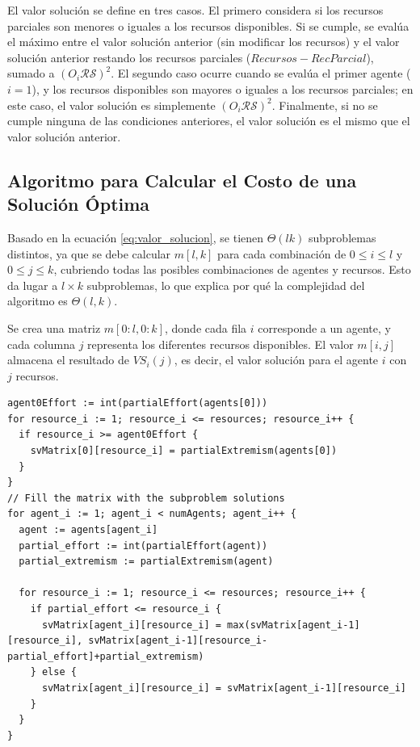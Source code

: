 \documentclass[letterpaper,10pt]{article}
\begin{document}
El valor solución se define en tres casos. El primero considera si los recursos parciales son menores o iguales a los recursos disponibles. Si se cumple, se evalúa el máximo entre el valor solución anterior (sin modificar los recursos) y el valor solución anterior restando los recursos parciales (\(Recursos - RecParcial\)), sumado a \((O_i\mathcal{R}\mathcal{S})^2\). El segundo caso ocurre cuando se evalúa el primer agente (\(i=1\)), y los recursos disponibles son mayores o iguales a los recursos parciales; en este caso, el valor solución es simplemente \((O_i\mathcal{R}\mathcal{S})^2\). Finalmente, si no se cumple ninguna de las condiciones anteriores, el valor solución es el mismo que el valor solución anterior.

\subsection{Algoritmo para Calcular el Costo de una Solución Óptima}
\label{subsec:algoritmo_costo_solucion_optima}
Basado en la ecuación \eqref{eq:valor_solucion}, se tienen \(\Theta(lk)\) subproblemas distintos, ya que se debe calcular \(m[l, k]\) para cada combinación de \(0 \leq i \leq l\) y \(0 \leq j \leq k\), cubriendo todas las posibles combinaciones de agentes y recursos. Esto da lugar a \(l \times k\) subproblemas, lo que explica por qué la complejidad del algoritmo es \(\Theta(l, k)\). 

Se crea una matriz \(m[0:l, 0:k]\), donde cada fila \(i\) corresponde a un agente, y cada columna \(j\) representa los diferentes recursos disponibles. El valor \(m[i,j]\) almacena el resultado de \(VS_i(j)\), es decir, el valor solución para el agente \(i\) con \(j\) recursos.

\begin{lstlisting}[caption={matrix $m$ $\rightarrow$Extracción del algoritmo ModexPD}, label={lst:modexpd_extraccion}]
agent0Effort := int(partialEffort(agents[0]))
for resource_i := 1; resource_i <= resources; resource_i++ {
  if resource_i >= agent0Effort {
    svMatrix[0][resource_i] = partialExtremism(agents[0])
  }
}
// Fill the matrix with the subproblem solutions
for agent_i := 1; agent_i < numAgents; agent_i++ {
  agent := agents[agent_i]
  partial_effort := int(partialEffort(agent))
  partial_extremism := partialExtremism(agent)

  for resource_i := 1; resource_i <= resources; resource_i++ {
    if partial_effort <= resource_i {
      svMatrix[agent_i][resource_i] = max(svMatrix[agent_i-1][resource_i], svMatrix[agent_i-1][resource_i-partial_effort]+partial_extremism)
    } else {
      svMatrix[agent_i][resource_i] = svMatrix[agent_i-1][resource_i]
    }
  }
}
\end{lstlisting}
\end{document}
